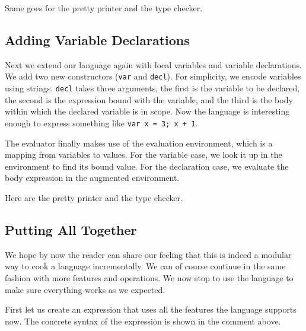 Same goes for the pretty printer and the type checker.



\subsection{Adding Variable Declarations}

Next we extend our language again with local variables and variable
declarations. We add two new constructors (\lstinline{var} and
\lstinline{decl}).
For simplicity, we encode variables using strings. \lstinline{decl} takes three
arguments, the first is the variable to be declared, the second is the
expression bound with the variable, and the third is the body within which the
declared variable is in scope. Now the language is interesting enough to express
something like \lstinline{var x = 3; x + 1}.

The evaluator finally makes use of the evaluation environment, which is a
mapping from variables to values.
For the variable case, we look it up in the environment to find its bound value.
For the declaration case, we evaluate the body expression in the augmented
environment.

Here are the pretty printer and the type checker.


\subsection{Putting All Together}

We hope by now the reader can share our feeling that this is indeed a modular
way to cook a language incrementally. We can of course continue in the same
fashion with more features and operations. We now stop to use the language to
make sure everything works as we expected.

First let us create an expression that uses all the features the language
supports now.
The concrete syntax of the expression is shown in the comment above.

